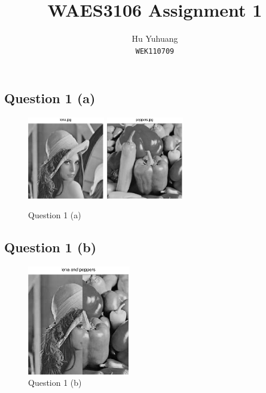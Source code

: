 \documentclass{article}
\title{WAES3106 Assignment 1}
\author{Hu Yuhuang\\
\texttt{WEK110709}}
\date{}
\begin{document}
\maketitle

\subsection*{Question 1 (a)}

\begin{figure}[!htm]
	\centering
	\includegraphics[width=0.3\textwidth]{assignment_1_01.eps}
	\includegraphics[width=0.3\textwidth]{assignment_1_02.eps}
	\caption{Question 1 (a)}
\end{figure}

\subsection*{Question 1 (b)}

\begin{figure}[!htm]
	\centering
	\includegraphics[width=0.4\textwidth]{assignment_1_03.eps}
	\caption{Question 1 (b)}
\end{figure}
\end{document}
